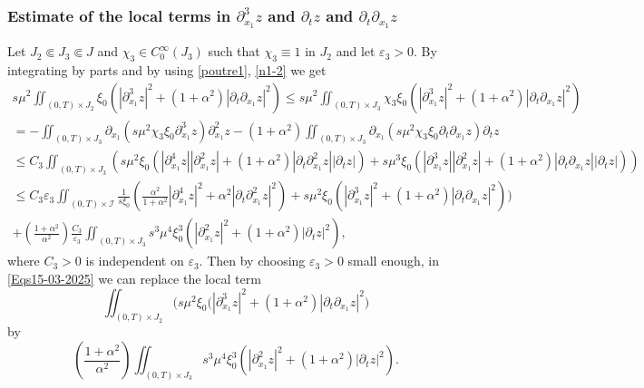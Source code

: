 \documentclass[a4paper, 12pt]{article}
\theoremstyle{plain}
\theoremstyle{definition}
\numberwithin{theorem}{section}
\numberwithin{equation}{section}
\begin{document}
{\subsubsection{Estimate of the local terms in \texorpdfstring{$\partial_{x_1}^3z$}{dx3} and \texorpdfstring{$\partial_t z$}{dtt1} and \texorpdfstring{$\partial_t \partial_{x_1}z$}{dertx}}
Let $J_2\Subset J_3\Subset J$ and $\chi_3\in C_0^\infty(J_3)$ such that $\chi_3\equiv 1$ in $J_2$ and let $\varepsilon_3>0$. By integrating by parts and by using \eqref{poutre1}, \eqref{n1-2} we get
\begin{multline*}
    s\mu^2 \iint_{(0,T)\times J_2}\xi_0(|\partial^3_{x_1}z|^2+(1+\alpha^2)|\partial_t\partial_{x_1}z|^2)\leq s\mu^2 \iint_{(0,T)\times J_3}\chi_3\xi_0(|\partial^3_{x_1}z|^2+(1+\alpha^2)|\partial_t\partial_{x_1}z|^2)\\
    = - \iint_{(0,T)\times J_3}\partial_{x_1}(s\mu^2\chi_3\xi_0\partial_{x_1}^3 z) \partial_{x_1}^2 z- (1+\alpha^2)\iint_{(0,T)\times J_3}\partial_{x_1}(s\mu^2\chi_3\xi_0\partial_t \partial_{x_1} z) \partial_{t} z\\
    \leq C_3 \iint_{(0,T)\times J_3}(s\mu^2\xi_0(|\partial_{x_1}^4 z||\partial_{x_1}^2 z|+(1+\alpha^2)|\partial_{t}\partial_{x_1}^2 z||\partial_{t} z|)+s\mu^3\xi_0(|\partial_{x_1}^3 z||\partial_{x_1}^2 z|+(1+\alpha^2)|\partial_{t}\partial_{x_1} z||\partial_{t} z|)) \\
    \leq C_3 \varepsilon_3 \iint_{(0,T)\times \mathcal{I}}\frac{1}{s\xi_0}\left(\frac{\alpha^2}{1+\alpha^2}|\partial_{x_1}^4 z|^2+\alpha^2|\partial_{t}\partial_{x_1}^2 z|^2\right)+s\mu^2\xi_0(|\partial_{x_1}^3 z|^2+(1+\alpha^2)|\partial_{t}\partial_{x_1} z|^2))\\
    +\left(\frac{1+\alpha^2}{\alpha^2}\right)\frac{C_3}{\varepsilon_3}\iint_{(0,T)\times J_3}s^3\mu^4\xi_0^3(|\partial_{x_1}^2 z|^2+(1+\alpha^2)|\partial_{t} z|^2),
\end{multline*}
where $C_3>0$ is independent on $\varepsilon_3$. Then by choosing $\varepsilon_3>0$ small enough, in \eqref{Eqs15-03-2025} we can replace the local term 
$$
\iint_{(0,T)\times J_2}\Big(s\mu^2\xi_0(|\partial^3_{x_1}z|^2+(1+\alpha^2)|\partial_t\partial_{x_1}z|^2\Big)
$$
by
$$
\left(\frac{1+\alpha^2}{\alpha^2}\right)\iint_{(0,T)\times J_3}s^3\mu^4\xi_0^3(|\partial_{x_1}^2 z|^2+(1+\alpha^2)|\partial_{t} z|^2).
$$

}
\end{document}
